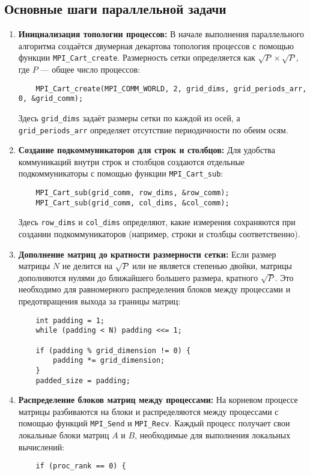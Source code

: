 \documentclass{report}
\begin{document}
\subsection*{Основные шаги параллельной задачи}

\begin{enumerate}
    \item \textbf{Инициализация топологии процессов:}  
    В начале выполнения параллельного алгоритма создаётся двумерная декартова топология процессов с помощью функции \texttt{MPI\_Cart\_create}. Размерность сетки определяется как $\sqrt{P} \times \sqrt{P}$, где $P$ — общее число процессов:
    \begin{lstlisting}
    MPI_Cart_create(MPI_COMM_WORLD, 2, grid_dims, grid_periods_arr, 0, &grid_comm);
    \end{lstlisting}
    Здесь \texttt{grid\_dims} задаёт размеры сетки по каждой из осей, а \texttt{grid\_periods\_arr} определяет отсутствие периодичности по обеим осям.

    \item \textbf{Создание подкоммуникаторов для строк и столбцов:}  
    Для удобства коммуникаций внутри строк и столбцов создаются отдельные подкоммуникаторы с помощью функции \texttt{MPI\_Cart\_sub}:
    \begin{lstlisting}
    MPI_Cart_sub(grid_comm, row_dims, &row_comm);
    MPI_Cart_sub(grid_comm, col_dims, &col_comm);
    \end{lstlisting}
    Здесь \texttt{row\_dims} и \texttt{col\_dims} определяют, какие измерения сохраняются при создании подкоммуникаторов (например, строки и столбцы соответственно).

    \item \textbf{Дополнение матриц до кратности размерности сетки:}  
    Если размер матрицы $N$ не делится на $\sqrt{P}$ или не является степенью двойки, матрицы дополняются нулями до ближайшего большего размера, кратного $\sqrt{P}$. Это необходимо для равномерного распределения блоков между процессами и предотвращения выхода за границы матриц:
    \begin{lstlisting}
    int padding = 1;
    while (padding < N) padding <<= 1;

    if (padding % grid_dimension != 0) {
        padding *= grid_dimension;
    }
    padded_size = padding;
    \end{lstlisting}

    \item \textbf{Распределение блоков матриц между процессами:}  
    На корневом процессе матрицы разбиваются на блоки и распределяются между процессами с помощью функций \texttt{MPI\_Send} и \texttt{MPI\_Recv}. Каждый процесс получает свои локальные блоки матриц $A$ и $B$, необходимые для выполнения локальных вычислений:
    \begin{lstlisting}
    if (proc_rank == 0) {


\end{lstlisting}
\end{enumerate}
\end{document}

